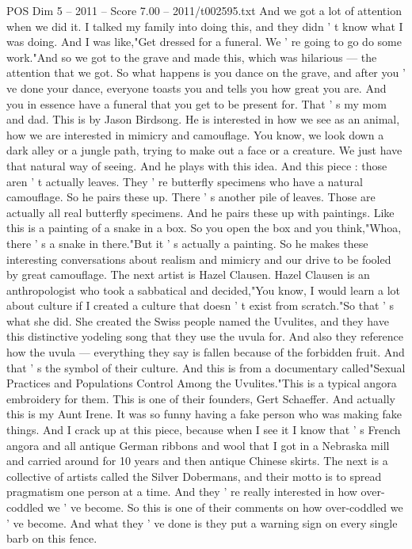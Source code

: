 \begin{textsample}{POS Dim 5 – 2011 – Score 7.00 – 2011/t002595.txt}
And we got a lot of attention when we did it.
I talked my family into doing this, and they didn ' t know what I was doing.
And I was like,"Get dressed for a funeral.
We ' re going to go do some work."And so we got to the grave and made this, which was hilarious — the attention that we got.
So what happens is you dance on the grave, and after you ' ve done your dance, everyone toasts you and tells you how great you are.
And you in essence have a funeral that you get to be present for.
That ' s my mom and dad.
This is by Jason Birdsong.
He is interested in how we see as an animal, how we are interested in mimicry and camouflage.
You know, we look down a dark alley or a jungle path, trying to make out a face or a creature.
We just have that natural way of seeing.
And he plays with this idea.
And this piece : those aren ' t actually leaves.
They ' re butterfly specimens who have a natural camouflage.
So he pairs these up.
There ' s another pile of leaves.
Those are actually all real butterfly specimens.
And he pairs these up with paintings.
Like this is a painting of a snake in a box.
So you open the box and you think,"Whoa, there ' s a snake in there."But it ' s actually a painting.
So he makes these interesting conversations about realism and mimicry and our drive to be fooled by great camouflage.
The next artist is Hazel Clausen.
Hazel Clausen is an anthropologist who took a sabbatical and decided,"You know, I would learn a lot about culture if I created a culture that doesn ' t exist from scratch."So that ' s what she did.
She created the Swiss people named the Uvulites, and they have this distinctive yodeling song that they use the uvula for.
And also they reference how the uvula — everything they say is fallen because of the forbidden fruit.
And that ' s the symbol of their culture.
And this is from a documentary called"Sexual Practices and Populations Control Among the Uvulites."This is a typical angora embroidery for them.
This is one of their founders, Gert Schaeffer.
And actually this is my Aunt Irene.
It was so funny having a fake person who was making fake things.
And I crack up at this piece, because when I see it I know that ' s French angora and all antique German ribbons and wool that I got in a Nebraska mill and carried around for 10 years and then antique Chinese skirts.
The next is a collective of artists called the Silver Dobermans, and their motto is to spread pragmatism one person at a time.
And they ' re really interested in how over-coddled we ' ve become.
So this is one of their comments on how over-coddled we ' ve become.
And what they ' ve done is they put a warning sign on every single barb on this fence.

\end{textsample}
